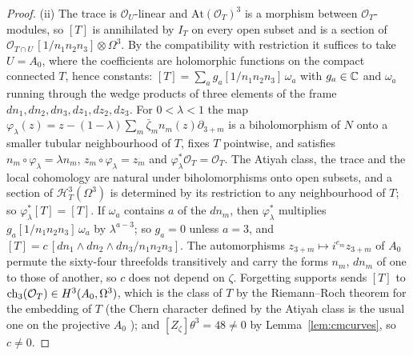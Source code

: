 \begin{proof}
(ii) The trace is $\mathcal{O}_{U}$-linear and $\mathrm{At}(\mathcal{O}_{T})^{3}$ is a morphism between $\mathcal{O}_{T}$-modules, so $[T]$ is annihilated by $I_{T}$ on every open subset and is a section of $\mathcal{O}_{T\cap U}\,[1/n_{1}n_{2}n_{3}]\otimes\Omega^{3}$. By the compatibility with restriction it suffices to take $U=A_{0}$, where the coefficients are holomorphic functions on the compact connected $T$, hence constants: $[T]=\sum_{a}g_{a}[1/n_{1}n_{2}n_{3}]\,\omega_{a}$ with $g_{a}\in\mathbb{C}$ and $\omega_{a}$ running through the wedge products of three elements of the frame $dn_{1},dn_{2},dn_{3},dz_{1},dz_{2},dz_{3}$. For $0<\lambda<1$ the map $\varphi_{\lambda}(z)=z-(1-\lambda)\sum_{m}\bar\zeta_{m}n_{m}(z)\partial_{3+m}$ is a biholomorphism of $N$ onto a smaller tubular neighbourhood of $T$, fixes $T$ pointwise, and satisfies $n_{m}\circ\varphi_{\lambda}=\lambda n_{m}$, $z_{m}\circ\varphi_{\lambda}=z_{m}$ and $\varphi_{\lambda}^{*}\mathcal{O}_{T}=\mathcal{O}_{T}$. The Atiyah class, the trace and the local cohomology are natural under biholomorphisms onto open subsets, and a section of $\mathcal{H}^{3}_{T}(\Omega^{3})$ is determined by its restriction to any neighbourhood of $T$; so $\varphi_{\lambda}^{*}[T]=[T]$. If $\omega_{a}$ contains $a$ of the $dn_{m}$, then $\varphi_{\lambda}^{*}$ multiplies $g_{a}[1/n_{1}n_{2}n_{3}]\,\omega_{a}$ by $\lambda^{a-3}$; so $g_{a}=0$ unless $a=3$, and $[T]=c\,[dn_{1}\wedge dn_{2}\wedge dn_{3}/n_{1}n_{2}n_{3}]$. The automorphisms $z_{3+m}\mapsto i^{e_{m}}z_{3+m}$ of $A_{0}$ permute the sixty-four threefolds transitively and carry the forms $n_{m}$, $dn_{m}$ of one to those of another, so $c$ does not depend on $\zeta$. Forgetting supports sends $[T]$ to $\mathrm{ch}_{3}(\mathcal{O}_{T})\in H^{3}(A_{0},\Omega^{3})$, which is the class of $T$ by the Riemann--Roch theorem for the embedding of $T$ \cite[Ch.~15]{Ful98} (the Chern character defined by the Atiyah class is the usual one on the projective $A_{0}$ \cite{BF03}); and $[Z_{\zeta}]\theta^{3}=48\ne0$ by Lemma~\ref{lem:cmcurves}, so $c\ne0$.


\end{proof}
